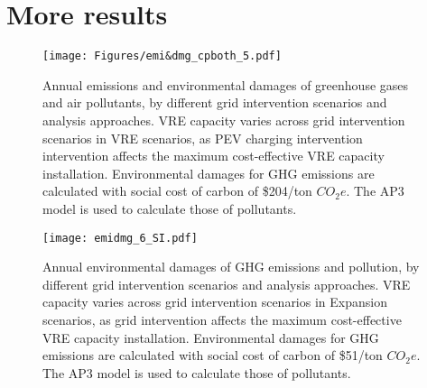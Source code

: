 \documentclass[9pt,twoside,lineno]{pnas-new}
\begin{document}
\section*{More results}

\newpage
\begin{figure}[!ht]
    \centering
    \texttt{[image: Figures/emi\&dmg\_cpboth\_5.pdf]}
    \caption{Annual emissions and environmental damages of greenhouse gases and air pollutants, by different grid intervention scenarios and analysis approaches. VRE capacity varies across grid intervention scenarios in VRE scenarios, as PEV charging intervention intervention affects the maximum cost-effective VRE capacity installation. Environmental damages for GHG emissions are calculated with social cost of carbon of \$204/ton $CO_2e$. The AP3 model is used to calculate those of pollutants.}
    \label{fig:emidmg51}
\end{figure}
\newpage
\begin{figure}[!ht]
    \centering
    \texttt{[image: emidmg\_6\_SI.pdf]}
    \caption{Annual environmental damages of GHG emissions and pollution, by different grid intervention scenarios and analysis approaches. VRE capacity varies across grid intervention scenarios in Expansion scenarios, as grid intervention affects the maximum cost-effective VRE capacity installation. Environmental damages for GHG emissions are calculated with social cost of carbon of \$51/ton $CO_2e$. The AP3 model is used to calculate those of pollutants.}
    \label{fig:emidmg51}
\end{figure}


\FloatBarrier



\end{document}
